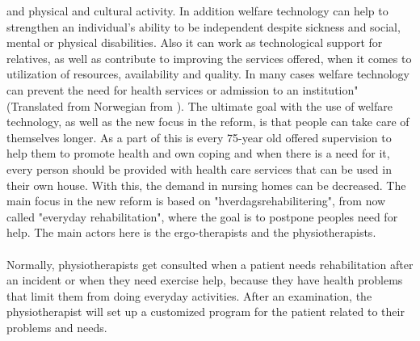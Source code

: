 and physical and cultural activity. In addition welfare technology can help to strengthen an individual's ability to be independent despite sickness and social, mental or physical disabilities. Also it can work as technological support for relatives, as well as contribute to improving the services offered, when it comes to utilization of resources, availability and quality. In many cases welfare technology can prevent the need for health services or admission to an institution" (Translated from Norwegian from \cite{welfare}). The ultimate goal with the use of welfare technology, as well as the new focus in the reform, is that people can take care of themselves longer.  As a part of this is every 75-year old offered supervision to help them to promote health and own coping and when there is a need for it, every person should be provided with health care services that can be used in their own house. With this, the demand in nursing homes can be decreased. The main focus in the new reform is based on "hverdagsrehabilitering", from now called "everyday rehabilitation", where the goal is to postpone peoples need for help. The main actors here is the ergo-therapists and the physiotherapists. \\ \\
Normally, physiotherapists get consulted when a patient needs rehabilitation after an incident or when they need exercise help, because they have health problems that limit them from doing everyday activities. After an examination, the physiotherapist will set up a customized program for the patient related to their problems and needs.\\ \\
